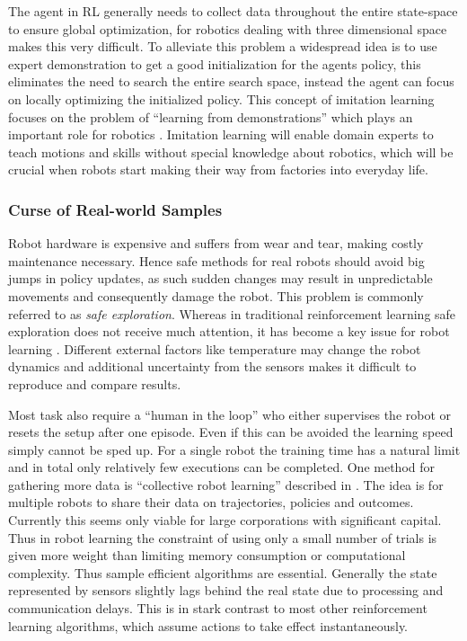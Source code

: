 The agent in RL generally needs to collect data throughout the entire
state-space to ensure global optimization, for robotics dealing with
three dimensional space makes this very difficult.
To alleviate this problem  a widespread idea is to use expert demonstration
to get a good initialization for the agents policy, this
eliminates the need to search the entire search space, instead the
agent can focus on locally optimizing the initialized policy.
This concept of imitation learning focuses on the problem of ``learning
from demonstrations'' which plays an important role
for robotics \citet{Osaetal18}. Imitation learning
will enable domain experts to teach motions and
skills without special knowledge about robotics, which will be crucial
when robots start making their way from factories into everyday life.

\subsubsection{Curse of Real-world Samples}
Robot hardware is expensive and suffers from wear and tear, making
costly maintenance necessary. Hence safe methods for real robots
should avoid big jumps in policy updates, as such sudden changes may
result in unpredictable movements and consequently damage the robot.
This problem is commonly referred to as \textit{safe exploration}.
Whereas in traditional reinforcement learning
safe exploration does not receive much attention,
it has become a key issue for robot learning \citet{schneider1997exploiting}.
Different external factors like temperature may change the robot dynamics and
additional uncertainty from the sensors makes it difficult to reproduce and
compare results.

Most task also require a ``human in the loop'' who either supervises the robot
or resets the setup after one episode. Even if this can be avoided the learning
speed simply cannot be sped up.
For a single robot the training time has a natural limit
and in total only relatively few executions can be completed.
One method for gathering more data is ``collective robot learning'' described in
\citet{kehoe2015survey}. The idea is for multiple robots to
share their data on trajectories, policies and outcomes. Currently this seems only
viable for large corporations with significant capital.
Thus in robot learning the constraint of using only a small number of trials
is given more weight than limiting memory consumption or computational complexity.
Thus sample efficient algorithms are essential.
Generally the state represented by sensors slightly lags behind the real
state due to processing and communication delays. This is in stark contrast to
most other reinforcement learning algorithms, which assume actions to take effect
instantaneously.


